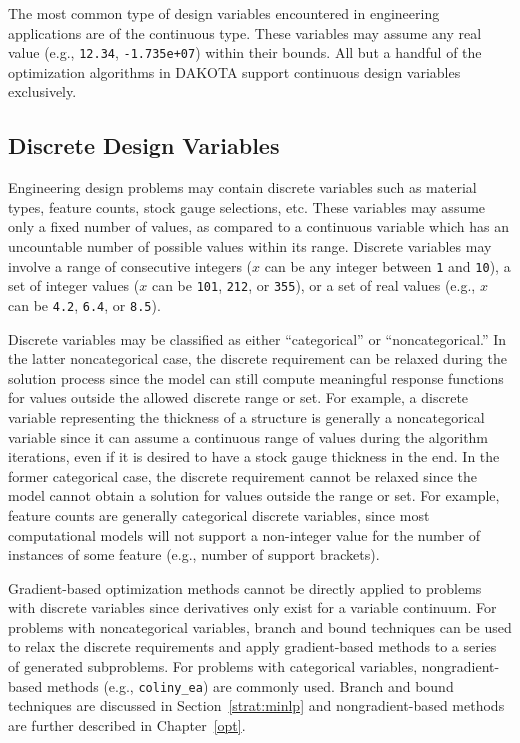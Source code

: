 The most common type of design variables encountered in engineering
applications are of the continuous type. These variables may assume
any real value (e.g., \texttt{12.34}, \texttt{-1.735e+07}) within
their bounds. All but a handful of the optimization algorithms in
DAKOTA support continuous design variables exclusively.

\subsection{Discrete Design Variables}\label{variables:design:ddv}

Engineering design problems may contain discrete variables such as
material types, feature counts, stock gauge selections, etc. These
variables may assume only a fixed number of values, as compared to
a continuous variable which has an uncountable number of possible 
values within its range.  Discrete variables may involve a range 
of consecutive integers ($x$ can be any integer between 
\texttt{1} and \texttt{10}), a set of integer values ($x$ can 
be \texttt{101}, \texttt{212}, or \texttt{355}), or a set of real 
values (e.g., $x$ can be \texttt{4.2}, \texttt{6.4}, or \texttt{8.5}).

Discrete variables may be classified as either ``categorical'' or
``noncategorical.''  In the latter noncategorical case, the discrete
requirement can be relaxed during the solution process since the model
can still compute meaningful response functions for values outside the
allowed discrete range or set. For example, a discrete variable
representing the thickness of a structure is generally a
noncategorical variable since it can assume a continuous range of
values during the algorithm iterations, even if it is desired to have
a stock gauge thickness in the end. In the former categorical case,
the discrete requirement cannot be relaxed since the model cannot
obtain a solution for values outside the range or set. For example,
feature counts are generally categorical discrete variables, since
most computational models will not support a non-integer value for the
number of instances of some feature (e.g., number of support brackets).

Gradient-based optimization methods cannot be directly applied to
problems with discrete variables since derivatives only exist for a
variable continuum. For problems with noncategorical variables, branch
and bound techniques can be used to relax the discrete requirements
and apply gradient-based methods to a series of generated
subproblems. For problems with categorical variables,
nongradient-based methods (e.g., \texttt{coliny\_ea}) are commonly
used. Branch and bound techniques are discussed in
Section~\ref{strat:minlp} and nongradient-based methods are further
described in Chapter~\ref{opt}.

